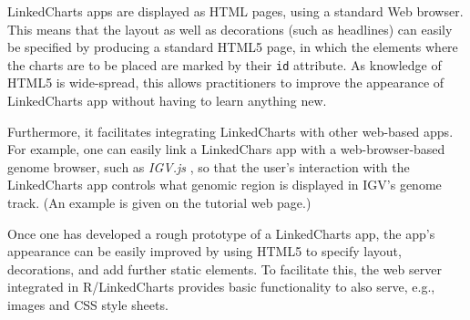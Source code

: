 \documentclass[twocolumn,10pt]{article}
\begin{document}
LinkedCharts apps are displayed as HTML pages, using a standard Web browser. This means that the layout as well as decorations (such as headlines) can easily be specified by producing a standard HTML5 page, in which the elements where the charts are to be placed are marked by their \texttt{id} attribute. As knowledge of HTML5 is wide-spread, this allows practitioners to improve the appearance of LinkedCharts app without having to learn anything new. 

Furthermore, it facilitates integrating LinkedCharts with other web-based apps. For example, one can easily link a LinkedChars app with a web-browser-based genome browser, such as \emph{IGV.js} \cite{robinson_2020}, so that the user's interaction with the LinkedCharts app controls what genomic region is displayed in IGV's genome track. (An example is given on the tutorial web page.)

Once one has developed a rough prototype of a LinkedCharts app, the app's appearance can be easily improved by using HTML5 to specify layout, decorations, and add further static elements. To facilitate this, the web server integrated in R/LinkedCharts provides basic functionality to also serve, e.g., images and CSS style sheets.
\end{document}
